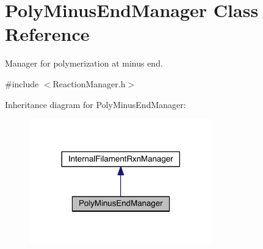 \hypertarget{classPolyMinusEndManager}{\section{Poly\+Minus\+End\+Manager Class Reference}
\label{classPolyMinusEndManager}
}


Manager for polymerization at minus end.  




{\ttfamily \#include $<$Reaction\+Manager.\+h$>$}



Inheritance diagram for Poly\+Minus\+End\+Manager\+:
\nopagebreak
\begin{figure}[H]
\begin{center}
\leavevmode
\includegraphics[width=225pt]{classPolyMinusEndManager__inherit__graph}
\end{center}
\end{figure}


